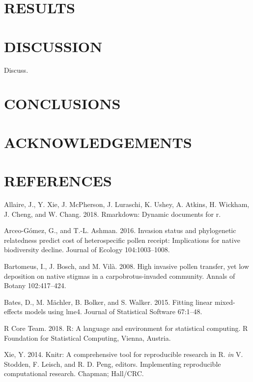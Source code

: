 \documentclass[11pt,a4paper]{article}
\begin{document}
\section{RESULTS}\label{results}

\section{DISCUSSION}\label{discussion}

Discuss.

\section{CONCLUSIONS}\label{conclusions}

\section{ACKNOWLEDGEMENTS}\label{acknowledgements}

\section{REFERENCES}\label{references}

\hypertarget{refs}{}
\hypertarget{ref-Allaire_2018}{}
Allaire, J., Y. Xie, J. McPherson, J. Luraschi, K. Ushey, A. Atkins, H.
Wickham, J. Cheng, and W. Chang. 2018. Rmarkdown: Dynamic documents for
r.

\hypertarget{ref-arceo2016}{}
Arceo-Gómez, G., and T.-L. Ashman. 2016. Invasion status and
phylogenetic relatedness predict cost of heterospecific pollen receipt:
Implications for native biodiversity decline. Journal of Ecology
104:1003--1008.

\hypertarget{ref-bartomeus2008}{}
Bartomeus, I., J. Bosch, and M. Vilà. 2008. High invasive pollen
transfer, yet low deposition on native stigmas in a carpobrotus-invaded
community. Annals of Botany 102:417--424.

\hypertarget{ref-Bates_2015}{}
Bates, D., M. Mächler, B. Bolker, and S. Walker. 2015. Fitting linear
mixed-effects models using lme4. Journal of Statistical Software
67:1--48.

\hypertarget{ref-R_Core_Team_2018}{}
R Core Team. 2018. R: A language and environment for statistical
computing. R Foundation for Statistical Computing, Vienna, Austria.

\hypertarget{ref-Xie_2014}{}
Xie, Y. 2014. Knitr: A comprehensive tool for reproducible research in
R. \emph{in} V. Stodden, F. Leisch, and R. D. Peng, editors.
Implementing reproducible computational research. Chapman; Hall/CRC.
\end{document}
